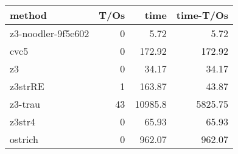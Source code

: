 \begin{tabular}{lrrr}
\hline
 method             &   T/Os &     time &   time-T/Os \\
\hline
 z3-noodler-9f5e602 &      0 &     5.72 &        5.72 \\
 cvc5               &      0 &   172.92 &      172.92 \\
 z3                 &      0 &    34.17 &       34.17 \\
 z3strRE            &      1 &   163.87 &       43.87 \\
 z3-trau            &     43 & 10985.8  &     5825.75 \\
 z3str4             &      0 &    65.93 &       65.93 \\
 ostrich            &      0 &   962.07 &      962.07 \\
\hline
\end{tabular}
